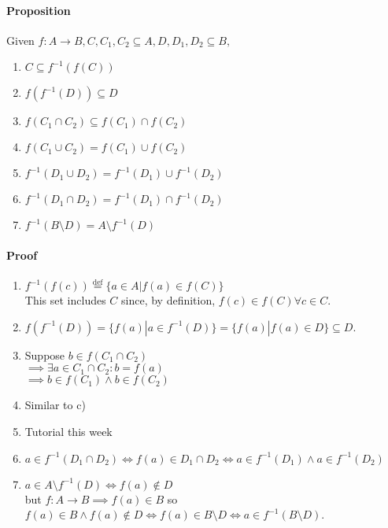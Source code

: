\documentclass{article}
\newcommand{\mapab}[2]{{#1}\xrightarrow{}{#2}}
\begin{document}
	\paragraph{Proposition}
	Given $f:\mapab{A}{B}, C,C_1,C_2 \subseteq A, D,D_1,D_2 \subseteq B,$
	\begin{enumerate}[label=\alph*)]
		\item $C\subseteq f^{-1}(f(C))$\\
		\item $f(f^{-1}(D))\subseteq D$\\
		\item $f(C_1\cap C_2)\subseteq f(C_1)\cap f(C_2)$\\
		\item $f(C_1\cup C_2) = f(C_1)\cup f(C_2)$\\
		\item $f^{-1}(D_1\cup D_2) = f^{-1}(D_1)\cup f^{-1}(D_2)$\\
		\item $f^{-1}(D_1\cap D_2) = f^{-1}(D_1)\cap f^{-1}(D_2)$\\
		\item $f^{-1}(B\setminus D) = A\setminus f^{-1}(D)$
	\end{enumerate}
	\paragraph{Proof}
	\begin{enumerate}[label=\alph*)]
		\item $f^{-1}(f(c))\stackrel{\textrm{def}}{=}\{a\in A|f(a)\in f(C)\}$\\
		This set includes $C$ since, by definition, $f(c)\in f(C) \forall c\in C$.\\
		\item $f(f^{-1}(D)) = \{f(a)|a\in f^{-1}(D)\}=\{f(a)|f(a)\in D\}\subseteq D$.\\
		\item Suppose $b\in f(C_1\cap C_2)$\\$\implies\exists a\in C_1\cap C_2:b=f(a)$\\$\implies b\in f(C_1)\land b\in f(C_2)$\\
		\item Similar to c)\\
		\item Tutorial this week\\
		\item $a\in f^{-1}(D_1\cap D_2)\iff f(a)\in D_1\cap D_2\iff a\in f^{-1}(D_1)\land a\in f^{-1}(D_2)$\\
		\item $a\in A\setminus f^{-1}(D)\iff f(a)\notin D$\\but $f:\mapab{A}{B}\implies f(a)\in B$ so $f(a)\in B\land f(a)\notin D\iff f(a)\in B\setminus D\iff a\in f^{-1}(B\setminus D)$.
	\end{enumerate}
\end{document}
